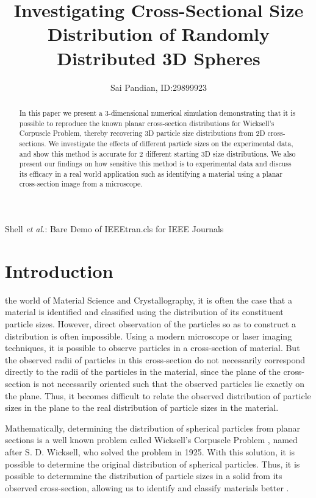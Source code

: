 \documentclass[journal]{IEEEtran}
\begin{document}
\title{Investigating Cross-Sectional Size Distribution of Randomly Distributed
       3D Spheres} 

\author{Sai Pandian, ID:\@ 29899923}%
        
{Shell \MakeLowercase{\textit{et al.}}: Bare Demo of IEEEtran.cls for IEEE Journals}

\maketitle

\begin{abstract}
  In this paper we present a 3-dimensional numerical simulation demonstrating
  that it is possible to reproduce the known planar cross-section distributions
  for Wicksell's Corpuscle Problem, thereby recovering 3D particle size
  distributions from 2D cross-sections. We investigate the effects of different
  particle sizes on the experimental data, and show this method is accurate for
  2 different starting 3D size distributions. We also present our findings on
  how sensitive this method is to experimental data and discuss its efficacy in
  a real world application such as identifying a material using a planar
  cross-section image from a microscope.
\end{abstract}

\section{Introduction}

 the world of Material Science and Crystallography, it is
often the case that a material is identified and classified using the
distribution of its constituent particle sizes. However, direct observation of
the particles so as to construct a distribution is often impossible. Using a
modern microscope or laser imaging techniques, it is possible to observe
particles in a cross-section of material. But the observed radii of particles in
this cross-section do not necessarily correspond directly to the radii of the
particles in the material, since the plane of the cross-section is not
necessarily oriented such that the observed particles lie exactly on the
plane. Thus, it becomes difficult to relate the observed distribution of
particle sizes in the plane to the real distribution of particle sizes in the
material.

Mathematically, determining the distribution of spherical particles from planar
sections is a well known problem called Wicksell's Corpuscle Problem
\cite{DWicksell}, named after S. D. Wicksell, who solved the problem in 1925. With
this solution, it is possible to determine the original distribution of
spherical particles. Thus, it is possible to determmine the distribution of
particle sizes in a solid from its observed cross-section, allowing us to
identify and classify materials better \cite{Cuzzi2016}.
\end{document}
